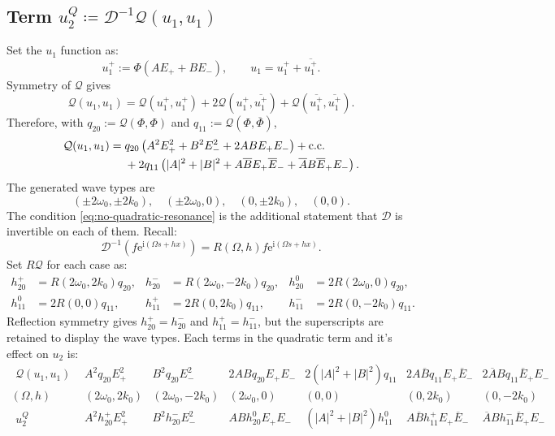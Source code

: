 \documentclass[11pt]{article}
\newcommand{\ii}{\mathrm{i}}
\newcommand{\ee}{\mathrm{e}}
\newcommand{\cQ}{\mathcal{Q}}
\newcommand{\cD}{\mathcal{D}}
\newcommand{\cc}{\mathrm{c.c.}}
\begin{document}
\subsection{Term $u_2^Q\coloneqq \cD^{-1}\cQ(u_1,u_1)$}
Set the $u_1$ function as:
\begin{equation}
 u_1^+:=\Phi(AE_++BE_-),
 \qquad u_1=u_1^++\overline{u_1^+}.
\end{equation}
Symmetry of $\cQ$ gives
\begin{equation}
 \cQ(u_1,u_1)=\cQ(u_1^+,u_1^+)
 +2\cQ(u_1^+,\overline{u_1^+})
 +\cQ(\overline{u_1^+},\overline{u_1^+}).
 \label{eq:Q-three-parts}
\end{equation}
Therefore, with $q_{20}:=\cQ(\Phi,\Phi)$ and $
 q_{11}:=\cQ(\Phi,\overline\Phi)$,
\begin{align}
 \cQ(u_1,u_1)={}&q_{20}
 \left(A^2E_+^2+B^2E_-^2+2AB E_+E_-\right)+\cc
 \notag\\
 &+2q_{11}\left(
 |A|^2+|B|^2+A\overline B E_+\overline E_-
 +\overline A B\overline E_+E_-
 \right).
 \label{eq:Q-u1-u1}
\end{align}
The generated wave types are
\[
 (\pm2\omega_0,\pm2k_0),\quad
 (\pm2\omega_0,0),\quad
 (0,\pm2k_0),\quad(0,0).
\]
The condition
\eqref{eq:no-quadratic-resonance} is the additional statement that $\cD$ is
invertible on each of them. Recall:
\[
 \cD^{-1}\left(f\ee^{\ii(\Omega s+hx)}\right)
 =R(\Omega,h)f\ee^{\ii(\Omega s+hx)}.
\]
Set $R\cQ$ for each case as:
\begin{align*}
\label{eq:h-vectors}
h_{20}^+ &= R(2\omega_0,2k_0)q_{20},
& h_{20}^- &= R(2\omega_0,-2k_0)q_{20},
& h_{20}^0 &= 2R(2\omega_0,0)q_{20},\\
h_{11}^0 &= 2R(0,0)q_{11},
& h_{11}^+ &= 2R(0,2k_0)q_{11},
& h_{11}^- &= 2R(0,-2k_0)q_{11}.
\end{align*}
Reflection symmetry gives $h_{20}^+=h_{20}^-$ and
$h_{11}^+=h_{11}^-$, but the superscripts are retained to display the wave
types. Each terms in the quadratic term and it's effect on $u_2$ is:
\begin{equation*}
\begin{array}{c||c|c|c|c|c|c}
\begin{array}{c}
\cQ(u_1,u_1)
\end{array}
& A^2q_{20}E_+^2
& B^2q_{20}E_-^2
& 2ABq_{20}E_+E_-
& 2(|A|^2+|B|^2)q_{11}
& 2A\overline Bq_{11}E_+\overline E_-
& 2\overline ABq_{11}\overline E_+E_-
\\ \hline
(\Omega,h)
& (2\omega_0,2k_0)
& (2\omega_0,-2k_0)
& (2\omega_0,0)
& (0,0)
& (0,2k_0)
& (0,-2k_0)
\\ \hline
\begin{array}{c}
u_2^Q
\end{array}
& A^2h_{20}^+E_+^2
& B^2h_{20}^-E_-^2
& ABh_{20}^0E_+E_-
& (|A|^2+|B|^2)h_{11}^0
& A\overline Bh_{11}^+E_+\overline E_-
& \overline ABh_{11}^-\overline E_+E_-
\end{array}
\end{equation*}
\end{document}

